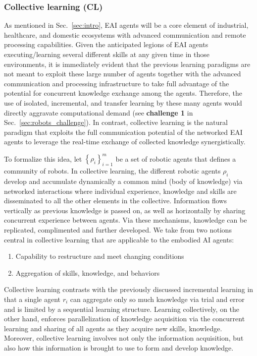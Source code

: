 \subsubsection{\textbf{Collective learning (CL)}}
As mentioned in Sec.~\ref{sec:intro}, EAI agents will be a core element of industrial, healthcare, and domestic ecosystems with advanced communication and remote processing capabilities. Given the anticipated legions of EAI agents executing/learning several different skills at any given time in those environments, it is immediately evident that the previous learning paradigms are not meant to exploit these large number of agents together with the advanced communication and processing infrastructure to take full advantage of the potential for concurrent knowledge exchange among the agents. Therefore, the use of isolated, incremental, and transfer learning by these many agents 
would directly aggravate computational demand (see \textbf{challenge 1} in Sec.~\ref{sec:robots_challenge}). In contrast, collective learning is the natural paradigm that exploits the full communication potential of the networked EAI agents to leverage the real-time exchange of collected knowledge synergistically.

To formalize this idea, let $ \left\lbrace \rho_i \right\rbrace_{i=1}^{m} $ be a set of robotic agents that defines a community of robots. In collective learning, the different robotic agents $ \rho_i $ develop and accumulate dynamically a common mind (body of knowledge) via networked interactions where individual experience, knowledge and skills are disseminated to all the other elements in the collective. Information flows vertically as previous knowledge is passed on, as well as horizontally by sharing concurrent experience between agents. Via these mechanisms, knowledge can be replicated, complimented and further developed. We take from \cite{Garavan2012CollectiveLearning} two notions central in collective learning that are applicable to the embodied AI agents:
\begin{enumerate}
	\item Capability to restructure and meet changing conditions
	\item Aggregation of skills, knowledge, and behaviors
\end{enumerate}
Collective learning contrasts with the previously discussed incremental learning in that a single agent $ r_i $ can aggregate only so much knowledge via trial and error and is limited by a sequential learning structure. Learning collectively, on the other hand, enforces parallelization of knowledge acquisition via the concurrent learning and sharing of all agents as they acquire new skills, knowledge. Moreover, collective learning involves not only the information acquisition, but also how this information is brought to use to form and develop knowledge. 

